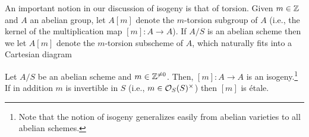 \documentclass[11pt]{article}
\begin{document}
An important notion in our discussion of isogeny is that of torsion. Given $m\in\mathbb{Z}$ and $A$ an abelian group, let $A[m]$ denote the $m$-torsion subgroup of $A$ (i.e., the kernel of the multiplication map $[m]: A\to A$). If $A/S$ is an abelian scheme then we let $A[m]$ denote the $m$-torsion subscheme of $A$, which naturally fits into a Cartesian diagram
\begin{center}
\end{center}

\begin{theorem}\label{Mult_Thm}
Let $A/S$ be an abelian scheme and $m\in\mathbb{Z}^{\neq0}$. Then, $[m]: A\to A$ is an isogeny.\footnote{Note that the notion of isogeny generalizes easily from abelian varieties to all abelian schemes.} If in addition $m$ is invertible in $S$ (i.e., $m\in\mathcal{O}_S(S)^{\times}$) then $[m]$ is \'{e}tale.
\end{theorem}
\end{document}
